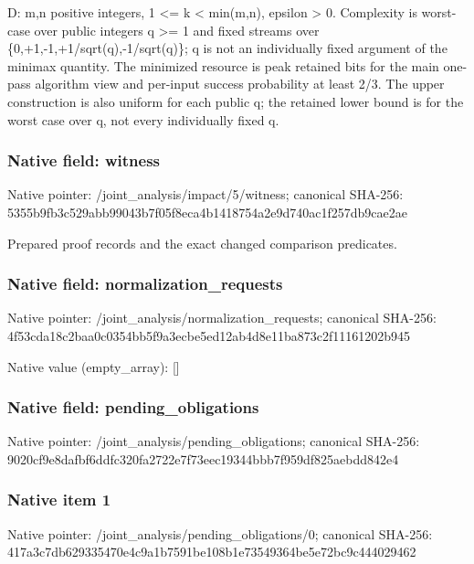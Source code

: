 \documentclass[10pt,a4paper]{article}
\begin{document}
\begingroup\raggedright\sloppy D:\allowbreak{} m,\allowbreak{}n positive integers,\allowbreak{} 1 <=\allowbreak{} k < min(m,\allowbreak{}n),\allowbreak{} epsilon > 0. Complexity is worst-case over public integers q >=\allowbreak{} 1 and fixed streams over \{0,\allowbreak{}+1,\allowbreak{}-1,\allowbreak{}+1/\allowbreak{}sqrt(q),\allowbreak{}-1/\allowbreak{}sqrt(q)\};\allowbreak{} q is not an individually fixed argument of the minimax quantity. The minimized resource is peak retained bits for the main one-pass algorithm view and per-input success probability at least 2/\allowbreak{}3. The upper construction is also uniform for each public q;\allowbreak{} the retained lower bound is for the worst case over q,\allowbreak{} not every individually fixed q.\par\endgroup

\subsubsection{Native field: witness}
Native pointer: /joint\_\allowbreak{}analysis/impact/5/witness; canonical SHA-256: 5355b9fb3c529abb99043b7f05f8eca4b1418754a2e9d740ac1f257db9cae2ae

\begingroup\raggedright\sloppy Prepared proof records and the exact changed comparison predicates.\par\endgroup

\subsubsection{Native field: normalization\_\allowbreak{}requests}
Native pointer: /joint\_\allowbreak{}analysis/normalization\_\allowbreak{}requests; canonical SHA-256: 4f53cda18c2baa0c0354bb5f9a3ecbe5ed12ab4d8e11ba873c2f11161202b945

Native value (empty\_\allowbreak{}array): []

\subsubsection{Native field: pending\_\allowbreak{}obligations}
Native pointer: /joint\_\allowbreak{}analysis/pending\_\allowbreak{}obligations; canonical SHA-256: 9020cf9e8dafbf6ddfc320fa2722e7f73eec19344bbb7f959df825aebdd842e4

\subsubsection{Native item 1}
Native pointer: /joint\_\allowbreak{}analysis/pending\_\allowbreak{}obligations/0; canonical SHA-256: 417a3c7db629335470e4c9a1b7591be108b1e73549364be5e72bc9c444029462
\end{document}
